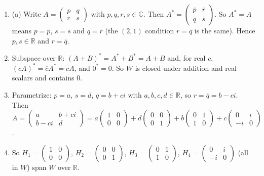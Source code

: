 \documentclass[11pt]{article}
\begin{document}
\begin{tcolorbox}[breakable,colback=ans,colframe=ansb,boxrule=0.5pt,left=4pt,right=4pt,top=2pt,bottom=2pt]\begin{enumerate}[leftmargin=3.1em,itemsep=1pt,topsep=1pt,label=\textbf{Step \arabic*.}]\item (a) Write $A=\begin{pmatrix}p&q\\r&s\end{pmatrix}$ with $p,q,r,s\in\mathbb{C}$. Then $A^{*}=\begin{pmatrix}\overline p&\overline r\\ \overline q&\overline s\end{pmatrix}$. So $A^{*}=A$ means $p=\overline p$, $s=\overline s$ and $q=\overline r$ (the $(2,1)$ condition $r=\overline q$ is the same). Hence $p,s\in\mathbb{R}$ and $r=\overline q$.
\item Subspace over $\mathbb{R}$: $(A+B)^{*}=A^{*}+B^{*}=A+B$ and, for real $c$, $(cA)^{*}=\overline cA^{*}=cA$, and $0^{*}=0$. So $W$ is closed under addition and real scalars and contains $0$.
\item Parametrize: $p=a$, $s=d$, $q=b+ci$ with $a,b,c,d\in\mathbb{R}$, so $r=\overline q=b-ci$. Then $A=\begin{pmatrix}a&b+ci\\ b-ci&d\end{pmatrix}=a\begin{pmatrix}1&0\\0&0\end{pmatrix}+d\begin{pmatrix}0&0\\0&1\end{pmatrix}+b\begin{pmatrix}0&1\\1&0\end{pmatrix}+c\begin{pmatrix}0&i\\-i&0\end{pmatrix}$.
\item So $H_1=\begin{pmatrix}1&0\\0&0\end{pmatrix}$, $H_2=\begin{pmatrix}0&0\\0&1\end{pmatrix}$, $H_3=\begin{pmatrix}0&1\\1&0\end{pmatrix}$, $H_4=\begin{pmatrix}0&i\\-i&0\end{pmatrix}$ (all in $W$) span $W$ over $\mathbb{R}$.

\end{enumerate}
\end{tcolorbox}
\end{document}
